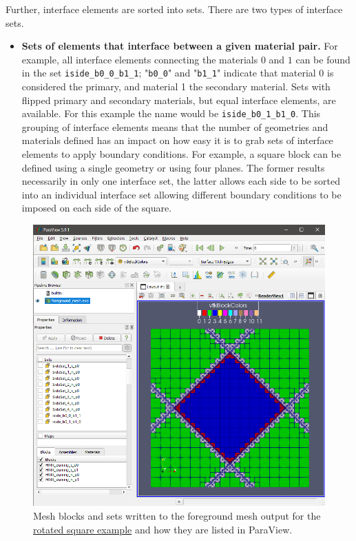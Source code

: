 Further, interface elements are sorted into sets. There are two types of interface sets.
\begin{itemize}
    \item \textbf{Sets of elements that interface between a given material pair.} For example, all interface elements connecting the materials $0$ and $1$ can be found in the set \texttt{iside\_b0\_0\_b1\_1}; "\texttt{b0\_0}" and "\texttt{b1\_1}" indicate that material 0 is considered the primary, and material 1 the secondary material. Sets with flipped primary and secondary materials, but equal interface elements, are available. For this example the name would be \texttt{iside\_b0\_1\_b1\_0}. 
    This grouping of interface elements means that the number of geometries and materials defined has an impact on how easy it is to grab sets of interface elements to apply boundary conditions. For example, a square block can be defined using a single geometry or using four planes. The former results necessarily in only one interface set, the latter allows each side to be sorted into an individual interface set allowing different boundary conditions to be imposed on each side of the square.
\end{itemize}

\begin{figure}[h]
    \begin{center}
    \includegraphics[width=12cm]{Figures/paraview_mesh_sets.png}
    \caption{Mesh blocks and sets written to the foreground mesh output for the \href{https://github.com/kkmaute/moris/blob/main/share/doc/mesh_generation/examples/Rotated_Square_Example.xml}{rotated square example} and how they are listed in ParaView.} 
    \label{fig:meshsets_paraview}
    \end{center}
\end{figure}


